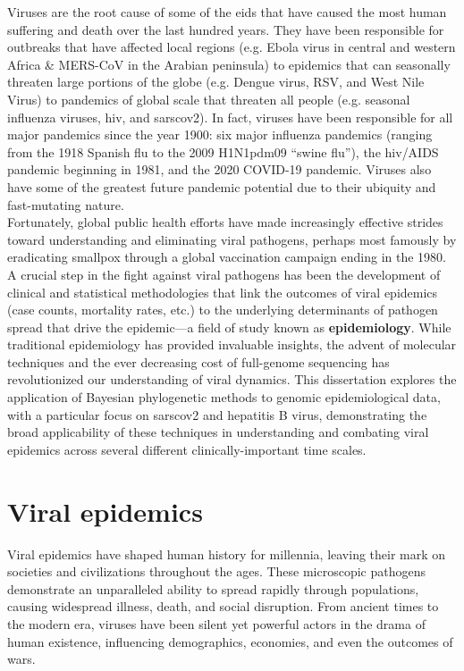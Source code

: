 Viruses are the root cause of some of the \gls{eid}s that have caused the most human suffering and death over the last hundred years.
They have been responsible for outbreaks that have affected local regions (e.g. Ebola virus in central and western Africa \& MERS-CoV in the Arabian peninsula) to epidemics that can seasonally threaten large portions of the globe (e.g. Dengue virus, RSV, and West Nile Virus) to pandemics of global scale that threaten all people (e.g. seasonal influenza viruses, \gls{hiv}, and \gls{sarscov2}).
In fact, viruses have been responsible for all major pandemics since the year 1900: six major influenza pandemics (ranging from the 1918 Spanish flu to the 2009 H1N1pdm09 ``swine flu''), the \gls{hiv}/AIDS pandemic beginning in 1981, and the 2020 COVID-19 pandemic.
Viruses also have some of the greatest future pandemic potential due to their ubiquity and fast-mutating nature.\\

Fortunately, global public health efforts have made increasingly effective strides toward understanding and eliminating viral pathogens, perhaps most famously by eradicating smallpox through a global vaccination campaign ending in the 1980.
A crucial step in the fight against viral pathogens has been the development of clinical and statistical methodologies that link the outcomes of viral epidemics (case counts, mortality rates, etc.) to the underlying determinants of pathogen spread that drive the epidemic---a field of study known as \textbf{epidemiology}.
While traditional epidemiology has provided invaluable insights, the advent of molecular techniques and the ever decreasing cost of full-genome sequencing has revolutionized our understanding of viral dynamics.
This dissertation explores the application of Bayesian phylogenetic methods to genomic epidemiological data, with a particular focus on \gls{sarscov2} and hepatitis B virus, demonstrating the broad applicability of these techniques in understanding and combating viral epidemics across several different clinically-important time scales.\\

\section{Viral epidemics}\label{sec:int-viralEpi}
Viral epidemics have shaped human history for millennia, leaving their mark on societies and civilizations throughout the ages.
These microscopic pathogens demonstrate an unparalleled ability to spread rapidly through populations, causing widespread illness, death, and social disruption.
From ancient times to the modern era, viruses have been silent yet powerful actors in the drama of human existence, influencing demographics, economies, and even the outcomes of wars.\\

